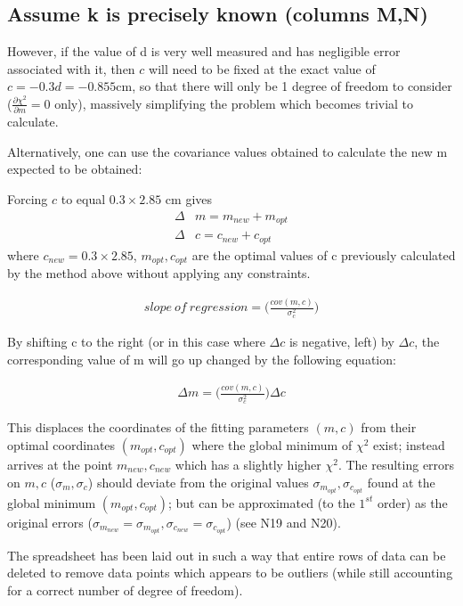 \documentclass[a4paper, 12pt]{article}
\begin{document}
\subsection{Assume k is precisely known (columns M,N)}
However, if the value of d is very well measured and has negligible error associated with it, then $c$ will need to be fixed at the exact value of $c=-0.3d=-0.855$cm, so that there will only be 1 degree of freedom to consider ($\frac{\partial \chi^2}{\partial m} = 0$ only), massively simplifying the problem which becomes trivial to calculate.

Alternatively, one can use the covariance values obtained to calculate the new m expected to be obtained:

Forcing $c$ to equal $0.3 \times 2.85$ cm gives 
\begin{align}
	\Delta & m = m_{new} + m_{opt}\\
	\Delta & c = c_{new} + c_{opt}
\end{align}
where $c_{new}= 0.3 \times 2.85$, $m_{opt}, c_{opt}$ are the optimal values of c previously calculated by the method above without applying any constraints.

\begin{align}
	slope \: of \: regression = \bigg( \frac{cov(m,c)}{\sigma_c^2} \bigg)
\end{align}

By shifting c to the right (or in this case where $\Delta c$ is negative, left) by $\Delta c$, the corresponding value of m will go up changed by the following equation:

\begin{align}
	\Delta m = \bigg( \frac{cov(m,c)}{\sigma_c^2} \bigg) \Delta c
\end{align}

This displaces the coordinates of the fitting parameters $(m,c)$ from their optimal coordinates $(m_{opt},c_{opt})$ where the global minimum of $\chi^2$ exist; instead arrives at the point $m_{new},c_{new}$ which has a slightly higher $\chi^2$. The resulting errors on $m,c$ ($\sigma_m, \sigma_c$) should deviate from the original values $\sigma_{m_{opt}}, \sigma_{c_{opt}}$ found at the global minimum $(m_{opt},c_{opt})$; but can be approximated (to the $1^{st}$ order) as the original errors ($\sigma_{m_{new}}=\sigma_{m_{opt}}, \sigma_{c_{new}}=\sigma_{c_{opt}}$) (see N19 and N20).

The spreadsheet has been laid out in such a way that entire rows of data can be deleted to remove data points which appears to be outliers (while still accounting for a correct number of degree of freedom).
\end{document}
